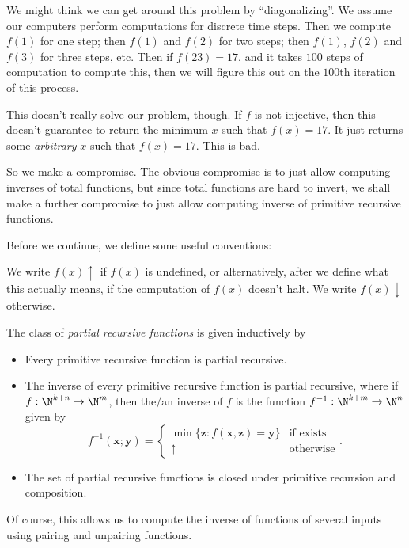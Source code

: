 \documentclass[a4paper]{article}
\begin{document}
We might think we can get around this problem by ``diagonalizing''. We assume our computers perform computations for discrete time steps. Then we compute $f(1)$ for one step; then $f(1)$ and $f(2)$ for two steps; then $f(1)$, $f(2)$ and $f(3)$ for three steps, etc. Then if $f(23) = 17$, and it takes $100$ steps of computation to compute this, then we will figure this out on the $100$th iteration of this process.

This doesn't really solve our problem, though. If $f$ is not injective, then this doesn't guarantee to return the minimum $x$ such that $f(x) = 17$. It just returns some \emph{arbitrary} $x$ such that $f(x) = 17$. This is bad.

So we make a compromise. The obvious compromise is to just allow computing inverses of total functions, but since total functions are hard to invert, we shall make a further compromise to just allow computing inverse of primitive recursive functions.

Before we continue, we define some useful conventions:
\begin{notation}\index{$\uparrow$}\index{$\downarrow$}
  We write $f(x) \uparrow$ if $f(x)$ is undefined, or alternatively, after we define what this actually means, if the computation of $f(x)$ doesn't halt. We write $f(x) \downarrow$ otherwise.
\end{notation}

\begin{defi}
  The class of \emph{partial recursive functions} is given inductively by
  \begin{itemize}
    \item Every primitive recursive function is partial recursive.
    \item The inverse of every primitive recursive function is partial recursive, where if $f: \N^{k + n} \to \N^m$, then the/an inverse of $f$ is the function $f^{-1}: \N^{k + m} \to \N^n$ given by
      \[
        f^{-1}(\mathbf{x}; \mathbf{y}) =
        \begin{cases}
          \min \{\mathbf{z}: f(\mathbf{x}, \mathbf{z}) = \mathbf{y}\} &\text{if exists}\\
          \uparrow & \text{otherwise}
        \end{cases}.
      \]
    \item The set of partial recursive functions is closed under primitive recursion and composition.
  \end{itemize}
\end{defi}
Of course, this allows us to compute the inverse of functions of several inputs using pairing and unpairing functions.
\end{document}
